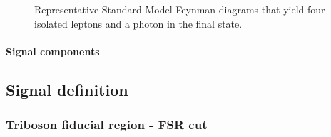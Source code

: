 \begin{figure}
  \centering
\caption{Representative Standard Model Feynman diagrams that yield four isolated leptons and a photon in the final state.}
\label{fig:ppTo4LG}
\end{figure}

\paragraph{Signal components\\}


\subsection{Signal definition}


\subsubsection{Triboson fiducial region - FSR cut}

